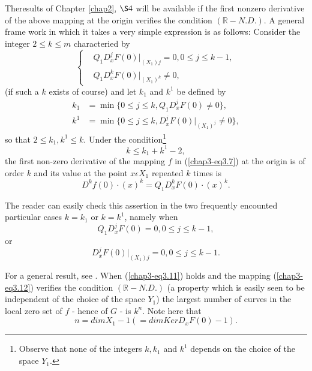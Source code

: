 The\pageoriginale results of Chapter \ref{chap2}, $\S 4$ will be
available if the first nonzero derivative of the above mapping at the
origin verifies the condition $(\mathbb{R}-N.D.)$. A general frame
work in which it takes a very simple expression is as follows:
Consider the integer $2 \leq k \leq m$ characteried by
\begin{equation*}
\begin{cases}
& Q_{1}D_{x}^{j}F(0) |_{(X_{1})j} = 0, 0 \leq j \leq k-1,\\
& Q_{1}D_{x}^{k}F(0) |_{(X_{1})^{k}} \neq 0,
\end{cases}\tag{3.8}\label{chap3-eq3.8}
\end{equation*}
(if such a $k$ exists of course) and let $k_{1}$ and $k^{1}$ be defined
by 
\begin{align*}
k_{1} & = \min \{0 \leq j \leq k, Q_{1}D_{x}^{j}F(0) \neq 0\}, \tag{3.9}\label{chap3-eq3.9}\\
k^{1} & = \min \{0 \leq j \leq k, D_{x}^{j}F(0) |_{(X_{1})^{j}} \neq 0\},\tag{3.10}\label{chap3-eq3.10}
\end{align*}
so that $2 \leq k_{1}, k^{1} \leq k$. Under the
condition\footnote{Observe that none of the integers $k, k_{1}$ and
  $k^{1}$ depends on the choice of the space $Y_{1}$.}
\begin{equation*}
k \leq k_{1} + k^{1} - 2,\tag{3.11}\label{chap3-eq3.11}
\end{equation*}
the first non-zero derivative of the mapping $f$ in (\ref{chap3-eq3.7})
at the origin is of order $k$ and its value at the point $x \epsilon
X_{1}$ repeated $k$ times is
\begin{equation*}
D^{k}f(0) \cdot (x)^{k} = Q_{1}D_{x}^{k}F(0) \cdot (x)^{k}.\tag{3.12}\label{chap3-eq3.12}
\end{equation*}

The reader can easily check this assertion in the two frequently
encounted particular cases $k = k_{1}$ or $k = k^{1}$, namely when
$$
Q_{1}D_{x}^{j}F(0) = 0, 0 \leq j \leq k-1,
$$
or
$$
D_{x}^{j}F(0) |_{(X_{1})j} = 0, 0 \leq j \leq k-1.
$$\pageoriginale

For a general result, see \cite{31}. When (\ref{chap3-eq3.11}) holds and
the mapping (\ref{chap3-eq3.12}) verifies the condition
$(\mathbb{R}-N.D.)$ (a property which is easily seen to be independent
of the choice of the space $Y_{1}$) the largest number of curves in
the local zero set of $f$ - hence of $G$ - is $k^{n}$. Note here that
\begin{equation*}
n = dim X_{1} - 1 (= dim Ker D_{x}F(0) - 1).\tag{3.13}\label{chap3-eq3.13}
\end{equation*}

